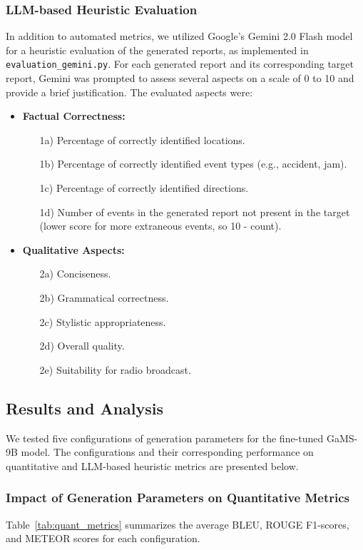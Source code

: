 \documentclass[fleqn,moreauthors,10pt]{ds_report}
\begin{document}
\subsubsection*{LLM-based Heuristic Evaluation}
In addition to automated metrics, we utilized Google's Gemini 2.0 Flash model for a heuristic evaluation of the generated reports, as implemented in \texttt{evaluation\_gemini.py}. For each generated report and its corresponding target report, Gemini was prompted to assess several aspects on a scale of 0 to 10 and provide a brief justification. The evaluated aspects were:
\begin{itemize}
    \item \textbf{Factual Correctness:}
        \begin{itemize}
            \item [1a)] Percentage of correctly identified locations.
            \item [1b)] Percentage of correctly identified event types (e.g., accident, jam).
            \item [1c)] Percentage of correctly identified directions.
            \item [1d)] Number of events in the generated report not present in the target (lower score for more extraneous events, so 10 - count).
        \end{itemize}
    \item \textbf{Qualitative Aspects:}
        \begin{itemize}
            \item [2a)] Conciseness.
            \item [2b)] Grammatical correctness.
            \item [2c)] Stylistic appropriateness.
            \item [2d)] Overall quality.
            \item [2e)] Suitability for radio broadcast.
        \end{itemize}
\end{itemize}

\subsection*{Results and Analysis}
We tested five configurations of generation parameters for the fine-tuned GaMS-9B model. The configurations and their corresponding performance on quantitative and LLM-based heuristic metrics are presented below.

\subsubsection*{Impact of Generation Parameters on Quantitative Metrics}
Table~\ref{tab:quant_metrics} summarizes the average BLEU, ROUGE F1-scores, and METEOR scores for each configuration.
\end{document}
